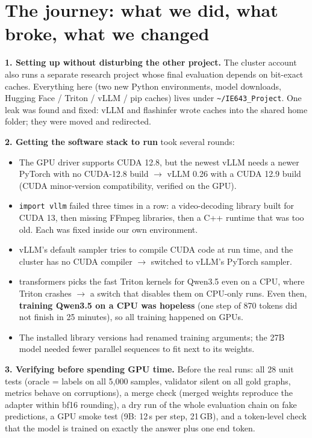 \documentclass[11pt,a4paper]{article}
\begin{document}
\section{The journey: what we did, what broke, what we changed}\label{sec:journey}

\noindent\textbf{1. Setting up without disturbing the other project.} The cluster account also runs a separate research
project whose final evaluation depends on bit-exact caches. Everything here (two new Python environments, model
downloads, Hugging Face / Triton / vLLM / pip caches) lives under \texttt{\textasciitilde/IE643\_Project}. One leak was
found and fixed: vLLM and flashinfer wrote caches into the shared home folder; they were moved and redirected.

\noindent\textbf{2. Getting the software stack to run} took several rounds:
\begin{itemize}[leftmargin=*]
\item The GPU driver supports CUDA 12.8, but the newest vLLM needs a newer PyTorch with no CUDA-12.8 build $\to$ vLLM
0.26 with a CUDA 12.9 build (CUDA minor-version compatibility, verified on the GPU).
\item \texttt{import vllm} failed three times in a row: a video-decoding library built for CUDA 13, then missing FFmpeg
libraries, then a C++ runtime that was too old. Each was fixed inside our own environment.
\item vLLM's default sampler tries to compile CUDA code at run time, and the cluster has no CUDA compiler $\to$ switched
to vLLM's PyTorch sampler.
\item transformers picks the fast Triton kernels for Qwen3.5 even on a CPU, where Triton crashes $\to$ a switch that
disables them on CPU-only runs. Even then, \textbf{training Qwen3.5 on a CPU was hopeless} (one step of 870 tokens did
not finish in 25 minutes), so all training happened on GPUs.
\item The installed library versions had renamed training arguments; the 27B model needed fewer parallel sequences to
fit next to its weights.
\end{itemize}

\noindent\textbf{3. Verifying before spending GPU time.} Before the real runs: all 28 unit tests (oracle = labels on all
5{,}000 samples, validator silent on all gold graphs, metrics behave on corruptions), a merge check (merged weights
reproduce the adapter within bf16 rounding), a dry run of the whole evaluation chain on fake predictions, a GPU smoke test
(9B: 12\,s per step, 21\,GB), and a token-level check that the model is trained on exactly the answer plus one end token.
\end{document}

